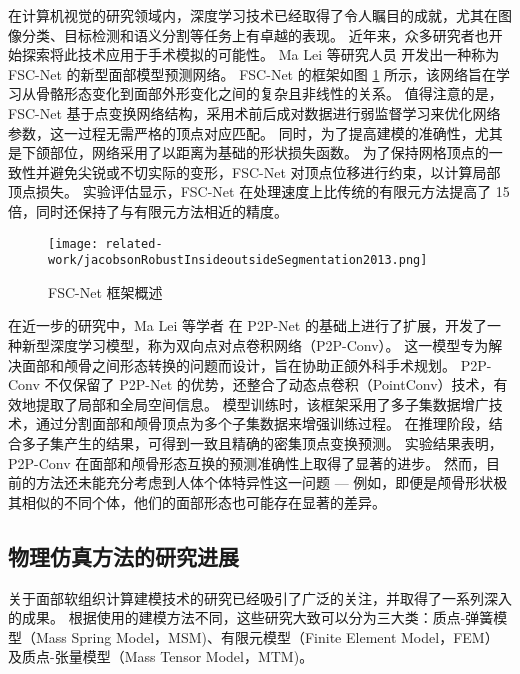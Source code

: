 在计算机视觉的研究领域内，深度学习技术已经取得了令人瞩目的成就，尤其在图像分类、目标检测和语义分割等任务上有卓越的表现。
近年来，众多研究者也开始探索将此技术应用于手术模拟的可能性。
Ma Lei 等研究人员 \cite{maSimulationPostoperativeFacial2023} 开发出一种称为 FSC-Net 的新型面部模型预测网络。
FSC-Net 的框架如图 \ref{fig:jacobsonRobustInsideoutsideSegmentation2013} 所示，该网络旨在学习从骨骼形态变化到面部外形变化之间的复杂且非线性的关系。
值得注意的是，FSC-Net 基于点变换网络结构，采用术前后成对数据进行弱监督学习来优化网络参数，这一过程无需严格的顶点对应匹配。
同时，为了提高建模的准确性，尤其是下颌部位，网络采用了以距离为基础的形状损失函数。
为了保持网格顶点的一致性并避免尖锐或不切实际的变形，FSC-Net 对顶点位移进行约束，以计算局部顶点损失。
实验评估显示，FSC-Net 在处理速度上比传统的有限元方法提高了 15 倍，同时还保持了与有限元方法相近的精度。

\begin{figure}
  \centering
  \texttt{[image: related-work/jacobsonRobustInsideoutsideSegmentation2013.png]}
  \caption{
    FSC-Net 框架概述 \cite{jacobsonRobustInsideoutsideSegmentation2013}
  }
  \label{fig:jacobsonRobustInsideoutsideSegmentation2013}
\end{figure}

在近一步的研究中，Ma Lei 等学者 \cite{maBidirectionalPredictionFacial2023} 在 P2P-Net \cite{yinP2PNETBidirectionalPoint2018} 的基础上进行了扩展，开发了一种新型深度学习模型，称为双向点对点卷积网络（P2P-Conv）。
这一模型专为解决面部和颅骨之间形态转换的问题而设计，旨在协助正颌外科手术规划。
P2P-Conv 不仅保留了 P2P-Net 的优势，还整合了动态点卷积（PointConv）技术，有效地提取了局部和全局空间信息。
模型训练时，该框架采用了多子集数据增广技术，通过分割面部和颅骨顶点为多个子集数据来增强训练过程。
在推理阶段，结合多子集产生的结果，可得到一致且精确的密集顶点变换预测。
实验结果表明，P2P-Conv 在面部和颅骨形态互换的预测准确性上取得了显著的进步。
然而，目前的方法还未能充分考虑到人体个体特异性这一问题 --- 例如，即便是颅骨形状极其相似的不同个体，他们的面部形态也可能存在显著的差异。

\subsection{物理仿真方法的研究进展}

关于面部软组织计算建模技术的研究已经吸引了广泛的关注，并取得了一系列深入的成果。
根据使用的建模方法不同，这些研究大致可以分为三大类：质点-弹簧模型（Mass Spring Model，MSM)、有限元模型（Finite Element Model，FEM）及质点-张量模型（Mass Tensor Model，MTM)。

